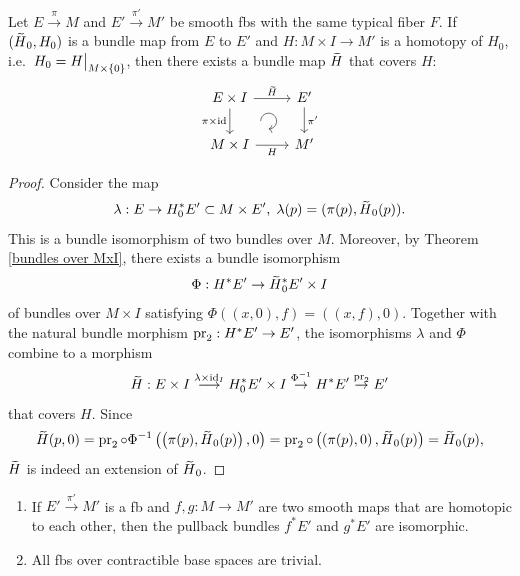 \begin{thm}\label{HLP}
    Let $E\overset{\pi}{\to}M$ and $E'\overset{\pi'}{\to}M'$ be smooth \glspl{fb} with the same typical fiber $F$. If $(\wt{H}_0,H_0)$ is a bundle map from $E$ to $E'$ and $H:M\times I\to M'$ is a homotopy of $H_0$, i.e.\ $H_0=\restr{H}{M\times\{0\}}$, then there exists a bundle map $\wt{H}$ that covers $H$:
    \[\begin{tikzcd}[every matrix/.append style={name=m}, execute at end picture={\draw [<-] ([xshift=-9mm,yshift=1mm]m-2-2.north) arc[start angle=-90,delta angle=270,radius=0.2cm];}]
    E\times I \arrow[r,"\wt{H}"]\arrow[d,swap,"\pi\times\id"]& E'\arrow[d,"\pi'"] \\
    M\times I\arrow[r,swap,"H"]& M'
    \end{tikzcd}\]
\end{thm}
\begin{proof}
    Consider the map
    \[
    \lambda:E\to H_0^\ast E'\subset M\times E',\; \lambda(p)=(\pi(p),\wt{H}_0(p)).
    \]
    This is a bundle isomorphism of two bundles over $M$. Moreover, by Theorem \ref{bundles over MxI}, there exists a bundle isomorphism 
    \[
    \Phi:H^\ast E'\to \wt{H}_0^\ast E'\times I
    \]
    of bundles over $M\times I$ satisfying $\Phi\left((x,0),f\right)=\left((x,f),0\right)$. Together with the natural bundle morphism $\operatorname{pr}_2:H^\ast E'\to E'$, the isomorphisms $\lambda $ and $\Phi$ combine to a morphism
    \[
    \wt{H}:E\times I\overset{\lambda\times\id_I}{\longrightarrow}H_0^\ast E' \times I\overset{\Phi^{-1}}{\to}H^\ast E'\overset{\pr_2}{\to}E'
    \]
    that covers $H$. Since 
    \[
    \wt{H}(p,0)=\pr_2\circ\Phi^{-1}\left(\left(\pi(p),\wt{H}_0(p)\right),0\right)=\pr_2\circ \left(\left(\pi(p),0\right),\wt{H}_0(p)\right)=\wt{H}_0(p),
    \]
    $\wt{H}$ is indeed an extension of $\wt{H}_0$.
\end{proof}




\begin{cor}\label{HLP cor}
\begin{enumerate}
    \item If $E'\overset{\pi'}{\to}M'$ is a \gls{fb} and $f,g:M\to M'$ are two smooth maps that are homotopic to each other, then the pullback bundles $f^\ast E'$ and $g^\ast E'$ are isomorphic.
    \item All \glspl{fb} over contractible base spaces are trivial.
\end{enumerate}
\end{cor}

